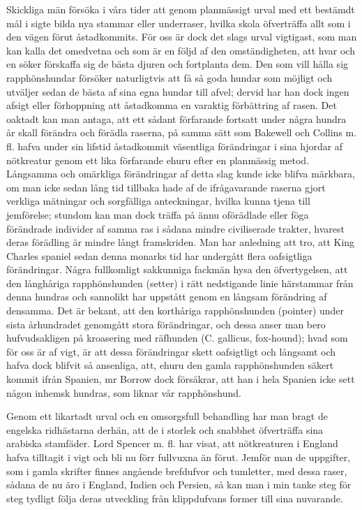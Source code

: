 Skickliga män försöka i våra tider att genom planmässigt urval med ett bestämdt mål i sigte bilda nya stammar eller underraser, hvilka skola öfverträffa allt som i den vägen förut åstadkommits. För oss är dock det slags urval vigtigast, som man kan kalla det omedvetna och som är en följd af den omständigheten, att hvar och en söker förskaffa sig de bästa djuren och fortplanta dem. Den som vill hålla sig rapphönshundar försöker naturligtvis att få så goda hundar som möjligt och utväljer sedan de bästa af sina egna hundar till afvel; dervid har han dock ingen afsigt eller förhoppning att åstadkomma en varaktig förbättring af rasen. Det oaktadt kan man antaga, att ett sådant förfarande fortsatt under några hundra år skall förändra och förädla raserna, på samma sätt som Bakewell och Collins m. fl. hafva under sin lifstid åstadkommit väsentliga förändringar i sina hjordar af nötkreatur genom ett lika förfarande ehuru efter en planmässig metod. Långsamma och omärkliga förändringar af detta slag kunde icke blifva märkbara, om man icke sedan lång tid tillbaka hade af de ifrågavarande raserna gjort verkliga mätningar och sorgfälliga anteckningar, hvilka kunna tjena till jemförelse; stundom kan man dock träffa på ännu oförädlade eller föga förändrade individer af samma ras i sådana mindre civiliserade trakter, hvarest deras förädling är mindre långt framskriden. Man har anledning att tro, att King Charles spaniel sedan denna monarks tid har undergått flera oafsigtliga förändringar. Några fullkomligt sakkunniga fackmän hysa den öfvertygelsen, att den långhåriga rapphönshunden (setter) i rätt nedstigande linie härstammar från denna hundras och sannolikt har uppstått genom en långsam förändring af densamma. Det är bekant, att den korthåriga rapphönshunden (pointer) under sista århundradet genomgått stora förändringar, och dessa anser man bero hufvudsakligen på kroasering med räfhunden (C. gallicus, fox-hound); hvad som för oss är af vigt, är att dessa förändringar skett oafsigtligt och långsamt och hafva dock blifvit så ansenliga, att, ehuru den gamla rapphönshunden säkert kommit ifrån Spanien, mr Borrow dock försäkrar, att han i hela Spanien icke sett någon inhemsk hundras, som liknar vår rapphönshund.

Genom ett likartadt urval och en omsorgsfull behandling har man bragt de engelska ridhästarna derhän, att de i storlek och snabbhet öfverträffa sina arabiska stamfäder. Lord Spencer m. fl. har visat, att nötkreaturen i England hafva tilltagit i vigt och bli nu förr fullvuxna än förut. Jemför man de uppgifter, som i gamla skrifter finnes angående brefdufvor och tumletter, med dessa raser, sådana de nu äro i England, Indien och Persien, så kan man i min tanke steg för steg tydligt följa deras utveckling från klippdufvans former till sina nuvarande.

